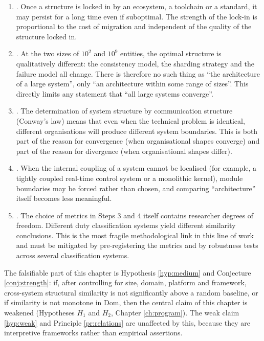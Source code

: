 \begin{enumerate}[label=(\alph*)]
\item {}. Once a structure is locked in by an ecosystem, a toolchain or
      a standard, it may persist for a long time even if suboptimal. The strength of the
      lock-in is proportional to the cost of migration and independent of the quality of the
      structure locked in.
\item {}. At the two sizes of $10^{2}$ and $10^{9}$ entities,
      the optimal structure is qualitatively different: the consistency model, the sharding
      strategy and the failure model all change. There is therefore no such thing as ``the
      architecture of a large system'', only ``an architecture within some range of sizes''.
      This directly limits any statement that ``all large systems converge''.
\item {}. The determination of system structure by communication
      structure (Conway's law) means that even when the technical problem is identical,
      different organisations will produce different system boundaries. This is both part of
      the reason for convergence (when organisational shapes converge) and part of the reason
      for divergence (when organisational shapes differ).
\item {}. When the internal coupling of a system cannot be
      localised (for example, a tightly coupled real-time control system or a monolithic
      kernel), module boundaries may be forced rather than chosen, and comparing
      ``architecture'' itself becomes less meaningful.
\item {}. The choice of metrics in
      Steps 3 and 4 itself contains researcher degrees of freedom. Different duty
      classification systems yield different similarity conclusions. This is the most fragile
      methodological link in this line of work and must be mitigated by pre-registering the
      metrics and by robustness tests across several classification systems.
\end{enumerate}

The falsifiable part of this chapter is Hypothesis \ref{hyp:medium} and
Conjecture \ref{conj:strength}: if, after controlling for size, domain, platform and
framework, cross-system structural similarity is not significantly above a random baseline,
or if similarity is not monotone in $\mathrm{Dom}$, then the central claim of this chapter is
weakened (Hypotheses $H_1$ and $H_2$, Chapter \ref{ch:program}). The weak claim
\ref{hyp:weak} and Principle \ref{pr:relations} are unaffected by this, because they are
interpretive frameworks rather than empirical assertions.
